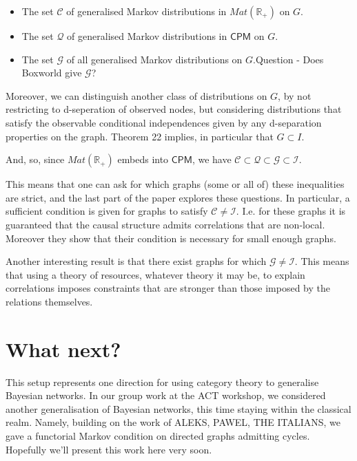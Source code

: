 \documentclass[11pt, oneside]{article}   	%
\begin{document}
\begin{itemize}
\item The set $\mathcal C$ of generalised Markov distributions in $Mat(\mathbb R_+)$ on $G$.
\item The set $\mathcal Q$ of generalised Markov distributions in $\mathsf{CPM}$ on $G$.
\item The set $\mathcal G$ of all generalised Markov distributions on $G$.Question - Does Boxworld give $\mathcal G$?

\end{itemize}

Moreover, we can distinguish another class of distributions on $G$, by not restricting to d-seperation of observed nodes, but considering distributions that satisfy the observable conditional independences given by any d-separation properties on the graph. Theorem 22 implies, in particular that $G \subset I$.

And, so, since $Mat(\mathbb R_+)$ embeds into $\mathsf{CPM}$, we have $\mathcal C \subset \mathcal Q \subset \mathcal G \subset \mathcal I$. 

This means that one can ask for which graphs (some or all of) these inequalities are strict, and the last part of the paper explores these questions. In particular, a sufficient condition is given for graphs to satisfy $\mathcal C \neq \mathcal I$. I.e. for these graphs it is guaranteed that the causal structure admits correlations that are non-local. Moreover they show that their condition is necessary for small enough graphs.

Another interesting result is that there exist graphs for which $ \mathcal G \neq \mathcal I$. This means that using a theory of resources, whatever theory it may be, to explain correlations imposes constraints that are stronger than those imposed by the relations themselves. 
\section{What next?}

This setup represents one direction for using category theory to generalise Bayesian networks. In our group work at the ACT workshop, we considered another generalisation of Bayesian networks, this time staying within the classical realm. Namely, building on the work of ALEKS, PAWEL, THE ITALIANS, we gave a functorial Markov condition on directed graphs admitting cycles. Hopefully we'll present this work here very soon.
\end{document}
